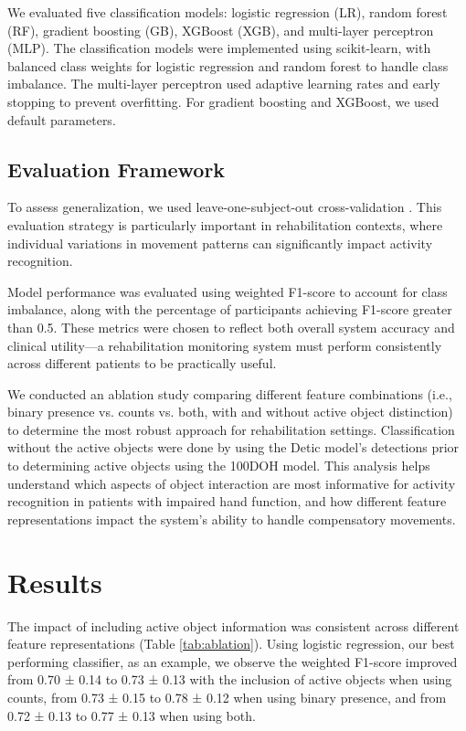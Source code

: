 \documentclass[journal,twoside,web]{ieeecolor}
\begin{document}
We evaluated five classification models: logistic regression (LR), random forest (RF), gradient boosting (GB), XGBoost (XGB), and multi-layer perceptron (MLP). The classification models were implemented using scikit-learn, with balanced class weights for logistic regression and random forest to handle class imbalance. The multi-layer perceptron used adaptive learning rates and early stopping to prevent overfitting. For gradient boosting and XGBoost, we used default parameters.

\subsection{Evaluation Framework}

To assess generalization, we used leave-one-subject-out cross-validation \cite{Gholamiangonabadi2020-dd}. This evaluation strategy is particularly important in rehabilitation contexts, where individual variations in movement patterns can significantly impact activity recognition.

Model performance was evaluated using weighted F1-score to account for class imbalance, along with the percentage of participants achieving F1-score greater than 0.5. These metrics were chosen to reflect both overall system accuracy and clinical utility---a rehabilitation monitoring system must perform consistently across different patients to be practically useful.

We conducted an ablation study comparing different feature combinations (i.e., binary presence vs. counts vs. both, with and without active object distinction) to determine the most robust approach for rehabilitation settings. Classification without the active objects were done by using the Detic \cite{Zhou2022-fl} model's detections prior to determining active objects using the 100DOH \cite{Shan2020-gh} model. This analysis helps understand which aspects of object interaction are most informative for activity recognition in patients with impaired hand function, and how different feature representations impact the system's ability to handle compensatory movements.


\section{Results}
The impact of including active object information was consistent across different feature representations (Table \ref{tab:ablation}). Using logistic regression, our best performing classifier, as an example, we observe the weighted F1-score improved from 0.70 ± 0.14 to 0.73 ± 0.13 with the inclusion of active objects when using counts, from 0.73 ± 0.15 to 0.78 ± 0.12 when using binary presence, and from 0.72 ± 0.13 to 0.77 ± 0.13 when using both.
\end{document}
